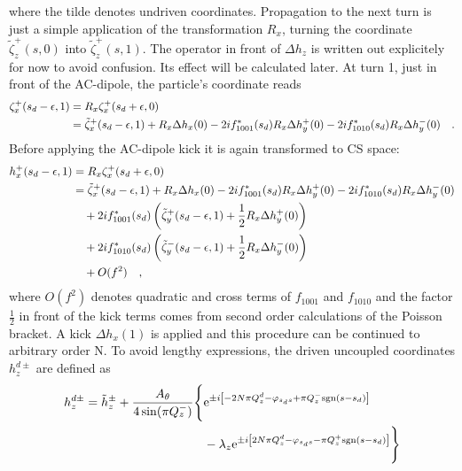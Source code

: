 %
where the tilde denotes undriven coordinates.
Propagation to the next turn is just a simple application of the transformation $R_x$, turning the
coordinate $\tilde{\zeta}_z^+(s,0)$ into $\tilde{\zeta}_z^+(s,1)$. The operator in front of $\Delta h_z$
is written out explicitely for now to avoid confusion. Its effect will be calculated later.
At turn 1, just in front of the AC-dipole, the particle's coordinate reads
%
\begin{align}
    \zeta_x^+(s_d-\epsilon, 1) &= R_x\zeta_x^+(s_d+\epsilon, 0) \notag \\
        &= \tilde{\zeta}_x^+(s_d-\epsilon, 1) + R_x\Delta h_x(0)
            - 2if_{1001}^*(s_d) R_x\Delta h_y^+(0)
            - 2if_{1010}^*(s_d) R_x\Delta h_y^-(0)
            \quad .
\end{align}
%
Before applying the AC-dipole kick it is again transformed to CS space:
%
\begin{align}
    h_x^+(s_d-\epsilon, 1) &=R_x\zeta_x^+(s_d+\epsilon, 0) \notag \\
        &=
        \tilde{\zeta}_x^+(s_d-\epsilon, 1) + R_x\Delta h_x(0)
            - 2if_{1001}^*(s_d) R_x\Delta h_y^+(0)
            - 2if_{1010}^*(s_d) R_x\Delta h_y^-(0)
        \notag \\ &\quad 
            + 2if_{1001}^*(s_d) \left(\tilde{\zeta}_y^+(s_d-\epsilon, 1) + \frac{1}{2}R_x\Delta h_y^+(0) \right)
        \notag \\ &\quad 
            + 2if_{1010}^*(s_d) \left(\tilde{\zeta}_y^-(s_d-\epsilon, 1) + \frac{1}{2}R_x\Delta h_y^-(0) \right)
        \notag \\ &\quad
            + O(f^2)
        \quad ,
    \label{eq_cpl_drv_n1}
\end{align}
%
where $O(f^2)$ denotes quadratic and cross terms of $f_{1001}$ and $f_{1010}$ and the factor $\frac{1}{2}$
in front of the kick terms comes from second order calculations of the Poisson bracket. 
A kick $\Delta h_x(1)$ is applied and this procedure can be continued to arbitrary order N.
To avoid lengthy expressions, the driven uncoupled coordinates $h_z^{d\pm}$ are defined as
%
\begin{align}
    h_z^{d\pm} = \tilde{h}_z^{\pm} 
    +\frac{A_\theta}{4\sin(\pi Q_z^-)} \Bigg\{&
    \text{e}^{\pm i\left[-2N\pi Q_z^d - \varphi_{s_ds} + \pi Q_z^-\text{sgn}(s-s_d)\right]}
    \notag\\
    &- \lambda_z\text{e}^{\pm i\left[2N\pi Q_z^d - \varphi_{s_ds} - \pi Q_z^+\text{sgn}(s-s_d)\right]}
    \Bigg\}
\end{align}
